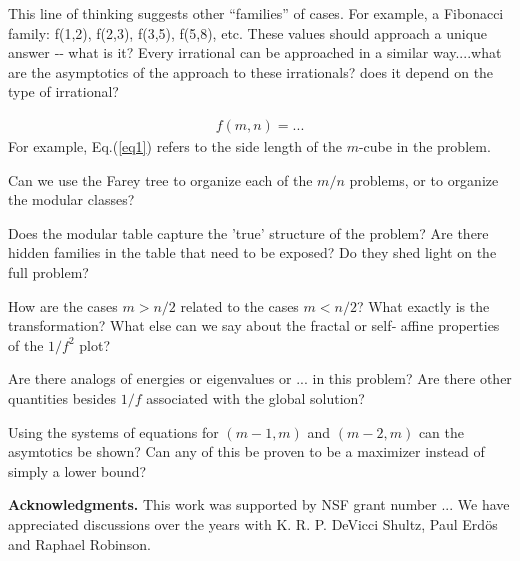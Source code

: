 \documentclass[superscriptaddress,reprint,amsmath,amssymb,aps]{revtex4-1}
\begin{document}
This line of thinking suggests other ``families'' of cases.  For example, a
Fibonacci family:  f(1,2), f(2,3), f(3,5), f(5,8), etc.  These values should
approach a unique answer ‐‐ what is it?  Every irrational can be approached
in a similar way....what are the asymptotics of the approach to these
irrationals?  does it depend on the type of irrational?


\begin{align}
f(m,n) = ...
\label{eq1}
\end{align}
For example, Eq.(\ref{eq1}) refers to the side length of the $m$-cube in the
problem.

\vspace{.15in}



Can we use the Farey tree to organize each of the $m/n$ problems, or to
organize the modular classes?

Does the modular table capture the ’true’ structure of the problem?  Are
there hidden families in the table that need to be exposed?  Do they shed
light on the full problem?

How are the cases $m > n/2$ related to the cases $m < n/2$?  What exactly
is the transformation?  What else can we say about the fractal or self‐
affine properties of the $1/f^2$ plot?

Are there analogs of energies or eigenvalues or ... in this problem? Are
there other quantities besides $1/f$ associated with the global solution?

Using the systems of equations for $(m-1,m)$ and $(m-2,m)$ can the asymtotics
be shown?  Can any of this be proven to be a maximizer instead of simply a
lower bound?



{\bf Acknowledgments.}
This work was supported by NSF grant number ... 
We have appreciated discussions over the years with K. R. P. DeVicci Shultz, Paul Erd\"os and Raphael Robinson.
\end{document}
